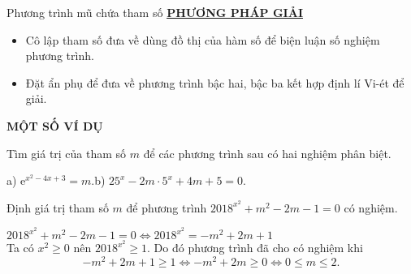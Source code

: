 \begin{dang}{Phương trình mũ chứa tham số}
 \underline{\textbf{PHƯƠNG PHÁP GIẢI}}
 \begin{itemize}
 \item Cô lập tham số đưa về dùng đồ thị của hàm số để biện luận số nghiệm phương trình.
 \item Đặt ẩn phụ để đưa về phương trình bậc hai, bậc ba kết hợp định lí Vi-ét để giải.
 \end{itemize}
\end{dang}
\begin{center}
\textbf{MỘT SỐ VÍ DỤ}
\end{center}
\setcounter{vd}{0}
\begin{vd}%
Tìm giá trị của tham số $m$ để các phương trình sau có hai nghiệm phân biệt.
\begin{multicols}{2}
a) $\mathrm{e}^{x^2-4x+3}=m$.\vfill b) $25^x-2m\cdot 5^x+4m+5=0$.
\end{multicols}

\end{vd}
\begin{vd}%
Định giá trị tham số $m$ để phương trình $2018^{x^2}+m^2-2m-1=0$ có nghiệm.
\loigiai
{$2018^{x^2}+m^2-2m-1=0 \Leftrightarrow 2018^{x^2}=-m^2+2m+1$\\
Ta có $x^2 \geq 0$ nên $2018^{x^2} \geq 1$. Do đó phương trình đã cho có nghiệm khi $$-m^2+2m+1 \geq 1 \Leftrightarrow -m^2+2m \geq 0 \Leftrightarrow 0 \leq m \leq 2.$$

}
\end{vd}

